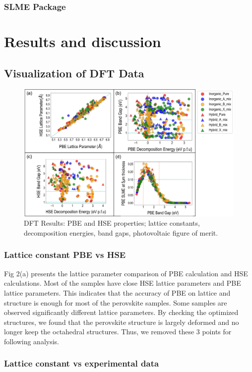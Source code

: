 \documentclass[twoside, twocolumn, 9pt, draft]{article}
\begin{document}
\subsubsection*{SLME Package}
\label{sec:orgc534696}
\section*{Results and discussion}
\label{sec:orgecc3d86}
\subsection*{Visualization of DFT Data}
\label{sec:org9f320a6}
\begin{figure}
\centering
\includegraphics[width=.9\linewidth]{Figure2.png}
\caption{\label{Fig:pairplots} DFT Results: PBE and HSE properties; lattice constants, decomposition energies, band gaps, photovoltaic figure of merit.}
\end{figure}

\subsubsection*{Lattice constant PBE vs HSE}
\label{sec:org6cf34d5}
Fig 2(a) presents the lattice parameter comparison of PBE calculation
and HSE calculations. Most of the samples have close HSE lattice
parameters and PBE lattice parameters. This indicates that the accuracy
of PBE on lattice and structure is enough for most of the perovskite
samples. Some samples are observed significantly different lattice
parameters. By checking the optimized structures, we found that the
perovskite structure is largely deformed and no longer keep the
octahedral structures. Thus, we removed these 3 points for following
analysis.

\subsubsection*{Lattice constant vs experimental data}
\label{sec:orgb553c8e}
\end{document}
